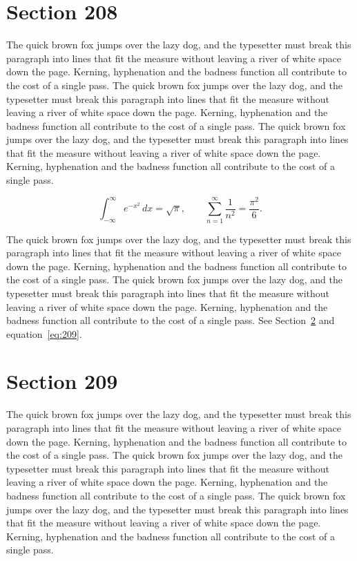 \documentclass{article}
\begin{document}
\section{Section 208}
\label{sec:208}
The quick brown fox jumps over the lazy dog, and the typesetter must break this paragraph into lines that fit the measure without leaving a river of white space down the page. Kerning, hyphenation and the badness function all contribute to the cost of a single pass. The quick brown fox jumps over the lazy dog, and the typesetter must break this paragraph into lines that fit the measure without leaving a river of white space down the page. Kerning, hyphenation and the badness function all contribute to the cost of a single pass. The quick brown fox jumps over the lazy dog, and the typesetter must break this paragraph into lines that fit the measure without leaving a river of white space down the page. Kerning, hyphenation and the badness function all contribute to the cost of a single pass. 

\begin{equation}\label{eq:208}
\int_{-\infty}^{\infty} e^{-x^{2}}\,dx = \sqrt{\pi}, \qquad
\sum_{n=1}^{\infty} \frac{1}{n^{2}} = \frac{\pi^{2}}{6}.
\end{equation}

The quick brown fox jumps over the lazy dog, and the typesetter must break this paragraph into lines that fit the measure without leaving a river of white space down the page. Kerning, hyphenation and the badness function all contribute to the cost of a single pass. The quick brown fox jumps over the lazy dog, and the typesetter must break this paragraph into lines that fit the measure without leaving a river of white space down the page. Kerning, hyphenation and the badness function all contribute to the cost of a single pass. 
See Section~\ref{sec:209} and equation~\eqref{eq:209}.
\section{Section 209}
\label{sec:209}
The quick brown fox jumps over the lazy dog, and the typesetter must break this paragraph into lines that fit the measure without leaving a river of white space down the page. Kerning, hyphenation and the badness function all contribute to the cost of a single pass. The quick brown fox jumps over the lazy dog, and the typesetter must break this paragraph into lines that fit the measure without leaving a river of white space down the page. Kerning, hyphenation and the badness function all contribute to the cost of a single pass. The quick brown fox jumps over the lazy dog, and the typesetter must break this paragraph into lines that fit the measure without leaving a river of white space down the page. Kerning, hyphenation and the badness function all contribute to the cost of a single pass. 
\end{document}
